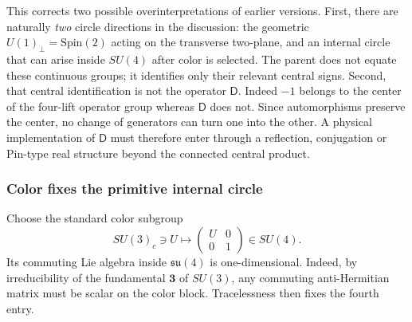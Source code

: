 \documentclass[11pt]{article}
\theoremstyle{definition}\newtheorem{definition}[theorem]{Definition}
\theoremstyle{remark}\newtheorem{remark}[theorem]{Remark}\newtheorem{conjecture}[theorem]{Conjecture}
\begin{document}
This corrects two possible overinterpretations of earlier versions. First, there are naturally \emph{two} circle directions in the discussion: the geometric $U(1)_\perp=\mathrm{Spin}(2)$ acting on the transverse two-plane, and an internal circle that can arise inside $SU(4)$ after color is selected. The parent does not equate these continuous groups; it identifies only their relevant central signs. Second, that central identification is not the operator $\mathsf D$. Indeed $-1$ belongs to the center of the four-lift operator group whereas $\mathsf D$ does not. Since automorphisms preserve the center, no change of generators can turn one into the other. A physical implementation of $\mathsf D$ must therefore enter through a reflection, conjugation or Pin-type real structure beyond the connected central product.

\subsubsection{Color fixes the primitive internal circle}
Choose the standard color subgroup
\begin{equation}
 SU(3)_c\ni U\longmapsto
 \begin{pmatrix}U&0\\0&1\end{pmatrix}\in SU(4).
\end{equation}
Its commuting Lie algebra inside $\mathfrak{su}(4)$ is one-dimensional. Indeed, by irreducibility of the fundamental $\mathbf3$ of $SU(3)$, any commuting anti-Hermitian matrix must be scalar on the color block. Tracelessness then fixes the fourth entry.
\end{document}
